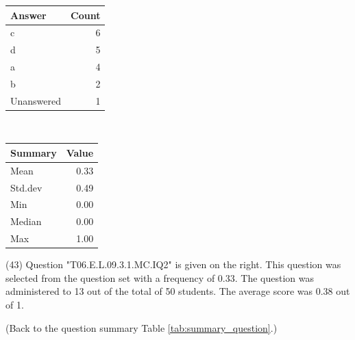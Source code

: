 \documentclass[12pt,english,nohyper]{tufte-handout}\usepackage[]{graphicx}\usepackage[]{color}
\begin{document}
\begin{center}%
\begin{tabular}{lr}
  \hline
Answer & Count \\ 
  \hline
c &   6 \\ 
  d &   5 \\ 
  a &   4 \\ 
  b &   2 \\ 
  Unanswered &   1 \\ 
   \hline
\end{tabular}
~~~~~~~~%
\begin{tabular}{lr}
  \hline
Summary & Value \\ 
  \hline
Mean & 0.33 \\ 
  Std.dev & 0.49 \\ 
  Min & 0.00 \\ 
  Median & 0.00 \\ 
  Max & 1.00 \\ 
   \hline
\end{tabular}
\end{center}\newpage{} (43) Question "T06.E.L.09.3.1.MC.IQ2" is given on the right. This question was selected from the question set with a frequency of 0.33. The question was administered to 13 out of the total of 50 students. The average score was 0.38 out of 1.

 (Back to the question summary Table \ref{tab:summary_question}.)
\end{document}
